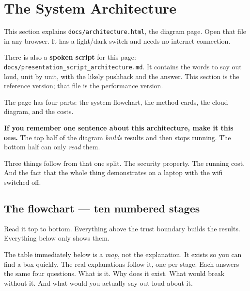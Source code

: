 \documentclass[11pt,a4paper]{article}
\newcommand{\code}[1]{\texttt{\small #1}}
\begin{document}
\section{The System Architecture}
\label{sec:arch}

This section explains \code{docs/architecture.html}, the diagram page. Open that
file in any browser. It has a light/dark switch and needs no internet
connection.

There is also a \textbf{spoken script} for this page:
\code{docs/presentation\_script\_architecture.md}. It contains the words to say
out loud, unit by unit, with the likely pushback and the answer. This section
is the reference version; that file is the performance version.

The page has four parts: the system flowchart, the method cards, the cloud
diagram, and the costs.

\begin{keybox}
\textbf{If you remember one sentence about this architecture, make it this
one.} The top half of the diagram \emph{builds} results and then stops running.
The bottom half can only \emph{read} them.

Three things follow from that one split. The security property. The running
cost. And the fact that the whole thing demonstrates on a laptop with the wifi
switched off.
\end{keybox}

\subsection{The flowchart --- ten numbered stages}

Read it top to bottom. Everything above the trust boundary builds the results.
Everything below only shows them.

The table immediately below is a \emph{map}, not the explanation. It exists so
you can find a box quickly. The real explanations follow it, one per stage. Each
answers the same four questions. What is it. Why does it exist. What would
break without it. And what would you actually say out loud about it.
\end{document}
